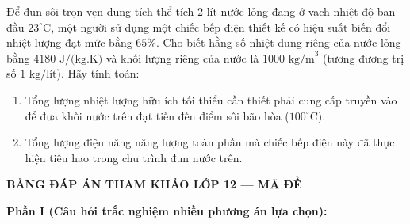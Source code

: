 \begin{ex}	Để đun sôi trọn vẹn dung tích thể tích $2\text{ lít}$ nước lỏng đang ở vạch nhiệt độ ban đầu $23^\circ\text{C}$, một người sử dụng một chiếc bếp điện thiết kế có hiệu suất biến đổi nhiệt lượng đạt mức bằng $65\%$. Cho biết hằng số nhiệt dung riêng của nước lỏng bằng $4180\text{ J/(kg.K)}$ và khối lượng riêng của nước là $1000\text{ kg/m}^3$ (tương đương trị số $1\text{ kg/lít}$). Hãy tính toán:
	\begin{enumerate}
		\item[a)] Tổng lượng nhiệt lượng hữu ích tối thiểu cần thiết phải cung cấp truyền vào để đưa khối nước trên đạt tiến đến điểm sôi bão hòa ($100^\circ\text{C}$).
		\item[b)] Tổng lượng điện năng năng lượng toàn phần mà chiếc bếp điện này đã thực hiện tiêu hao trong chu trình đun nước trên.
	\end{enumerate}
\end{ex}


\newpage
\begin{center} \textbf{BẢNG ĐÁP ÁN THAM KHẢO LỚP 12 --- MÃ ĐỀ \thedeso} \end{center}

\noindent \textbf{Phần I (Câu hỏi trắc nghiệm nhiều phương án lựa chọn):}